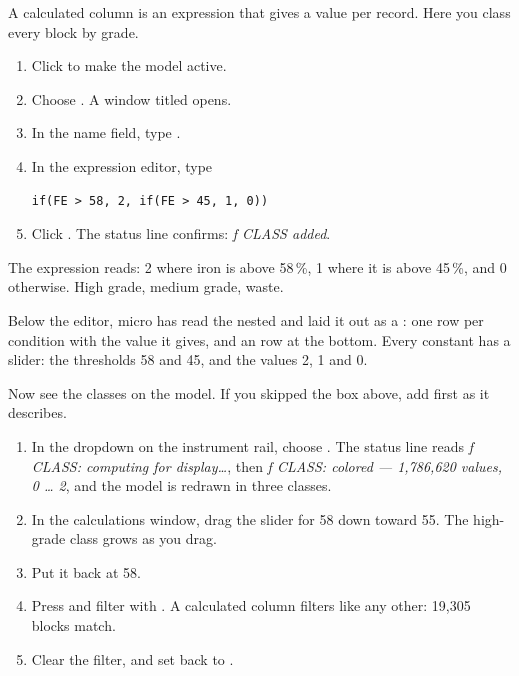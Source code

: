 A calculated column is an expression that gives a value per record. Here you class every block by grade.

\begin{tryit}
\begin{enumerate}
\item Click  to make the model active.
\item Choose . A window titled  opens.
\item In the name field, type .
\item In the expression editor, type
\begin{lstlisting}[language=expr]
if(FE > 58, 2, if(FE > 45, 1, 0))
\end{lstlisting}
\item Click . The status line confirms: \emph{ƒ CLASS added}.
\end{enumerate}
\end{tryit}

The expression reads: 2 where iron is above 58\,\%, 1 where it is above 45\,\%, and 0 otherwise. High grade, medium grade, waste.


Below the editor, micro has read the nested  and laid it out as a : one row per condition with the value it gives, and an  row at the bottom. Every constant has a slider: the thresholds 58 and 45, and the values 2, 1 and 0.

Now see the classes on the model. If you skipped the box above, add  first as it describes.

\begin{tryit}
\begin{enumerate}
\item In the  dropdown on the instrument rail, choose . The status line reads \emph{ƒ CLASS: computing for display…}, then \emph{ƒ CLASS: colored — 1,786,620 values, 0 … 2}, and the model is redrawn in three classes.
\item In the calculations window, drag the slider for 58 down toward 55. The high-grade class grows as you drag.
\item Put it back at 58.
\item Press \key{/} and filter with . A calculated column filters like any other: 19,305 blocks match.
\item Clear the filter, and set  back to .
\end{enumerate}
\end{tryit}

